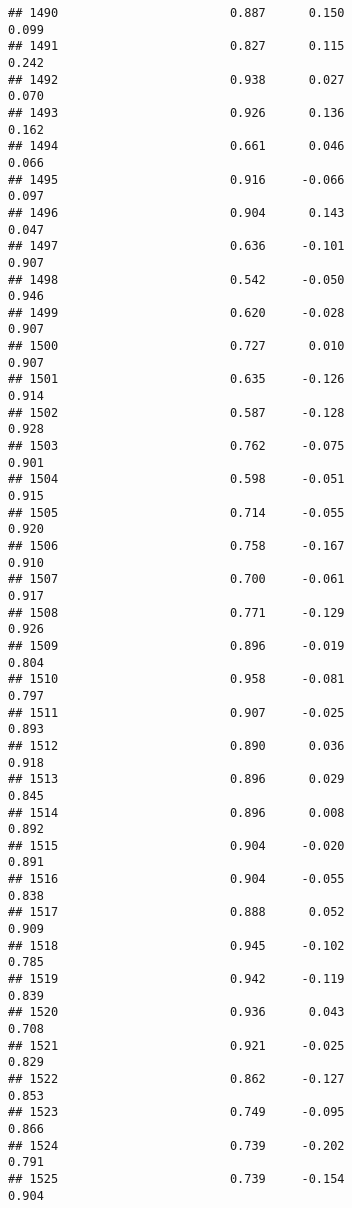 \documentclass[
]{article}
\begin{document}
\begin{verbatim}
## 1490                        0.887      0.150                     0.099
## 1491                        0.827      0.115                     0.242
## 1492                        0.938      0.027                     0.070
## 1493                        0.926      0.136                     0.162
## 1494                        0.661      0.046                     0.066
## 1495                        0.916     -0.066                     0.097
## 1496                        0.904      0.143                     0.047
## 1497                        0.636     -0.101                     0.907
## 1498                        0.542     -0.050                     0.946
## 1499                        0.620     -0.028                     0.907
## 1500                        0.727      0.010                     0.907
## 1501                        0.635     -0.126                     0.914
## 1502                        0.587     -0.128                     0.928
## 1503                        0.762     -0.075                     0.901
## 1504                        0.598     -0.051                     0.915
## 1505                        0.714     -0.055                     0.920
## 1506                        0.758     -0.167                     0.910
## 1507                        0.700     -0.061                     0.917
## 1508                        0.771     -0.129                     0.926
## 1509                        0.896     -0.019                     0.804
## 1510                        0.958     -0.081                     0.797
## 1511                        0.907     -0.025                     0.893
## 1512                        0.890      0.036                     0.918
## 1513                        0.896      0.029                     0.845
## 1514                        0.896      0.008                     0.892
## 1515                        0.904     -0.020                     0.891
## 1516                        0.904     -0.055                     0.838
## 1517                        0.888      0.052                     0.909
## 1518                        0.945     -0.102                     0.785
## 1519                        0.942     -0.119                     0.839
## 1520                        0.936      0.043                     0.708
## 1521                        0.921     -0.025                     0.829
## 1522                        0.862     -0.127                     0.853
## 1523                        0.749     -0.095                     0.866
## 1524                        0.739     -0.202                     0.791
## 1525                        0.739     -0.154                     0.904

\end{verbatim}
\end{document}
